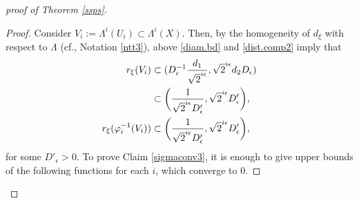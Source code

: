 \documentclass[12pt,a4paper]{amsart}
\theoremstyle{remark}
\theoremstyle{definition}
\begin{document}
\begin{proof}[proof of Theorem \ref{ssps}]
\begin{proof}
Consider $V_i:=\Lambda^{i}(U_i)\subset \Lambda^i(X)$. 
Then, by the homogeneity of $d_\xi$ with respect to $\Lambda$ (cf., 
Notation \ref{ntt3}), 
above \eqref{diam.bd} and \eqref{dist.comp2} imply that 
\begin{align}
r_\xi(V_i)&\subset (D_\epsilon^{-1} \frac{d_1}{\sqrt{2}^{i\epsilon}}, \sqrt{2}^{i\epsilon}d_2 D_\epsilon)\\ 
&\subset 
\biggl(\frac{1}{\sqrt{2}^{i\epsilon} D'_\epsilon}, \sqrt{2}^{i\epsilon} D'_\epsilon \biggr),\\
\label{diam.bd2} r_\xi(\varphi_i^{-1}(V_i))&\subset \biggl(\frac{1}{\sqrt{2}^{i\epsilon} D'_\epsilon}, \sqrt{2}^{i\epsilon} D'_\epsilon \biggr), 
\vspace{-5mm}
\end{align}
\noindent
for some $D'_\epsilon>0$. 
To prove Claim \ref{sigmaconv3}, it is enough 
to give upper bounds of the following functions 
for each $i$, 
which converge to $0$. 


\end{proof}
\end{proof}
\end{document}
